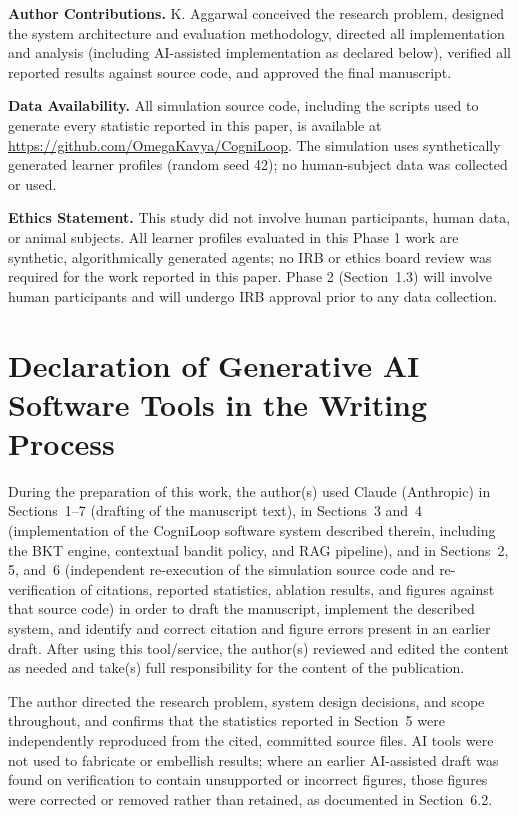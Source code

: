 \documentclass[notitlepage,12pt]{jedm}
\begin{document}
\noindent\textbf{Author Contributions.} K. Aggarwal conceived the research problem, designed the system architecture and evaluation methodology, directed all implementation and analysis (including AI-assisted implementation as declared below), verified all reported results against source code, and approved the final manuscript.

\noindent\textbf{Data Availability.} All simulation source code, including the scripts used to generate every statistic reported in this paper, is available at \url{https://github.com/OmegaKavya/CogniLoop}. The simulation uses synthetically generated learner profiles (random seed 42); no human-subject data was collected or used.

\noindent\textbf{Ethics Statement.} This study did not involve human participants, human data, or animal subjects. All learner profiles evaluated in this Phase 1 work are synthetic, algorithmically generated agents; no IRB or ethics board review was required for the work reported in this paper. Phase 2 (Section~1.3) will involve human participants and will undergo IRB approval prior to any data collection.

\section*{Declaration of Generative AI Software Tools in the Writing Process}

During the preparation of this work, the author(s) used Claude (Anthropic) in Sections~1--7 (drafting of the manuscript text), in Sections~3 and~4 (implementation of the CogniLoop software system described therein, including the BKT engine, contextual bandit policy, and RAG pipeline), and in Sections~2, 5, and~6 (independent re-execution of the simulation source code and re-verification of citations, reported statistics, ablation results, and figures against that source code) in order to draft the manuscript, implement the described system, and identify and correct citation and figure errors present in an earlier draft. After using this tool/service, the author(s) reviewed and edited the content as needed and take(s) full responsibility for the content of the publication.

The author directed the research problem, system design decisions, and scope throughout, and confirms that the statistics reported in Section~5 were independently reproduced from the cited, committed source files. AI tools were not used to fabricate or embellish results; where an earlier AI-assisted draft was found on verification to contain unsupported or incorrect figures, those figures were corrected or removed rather than retained, as documented in Section~6.2.



\end{document}
